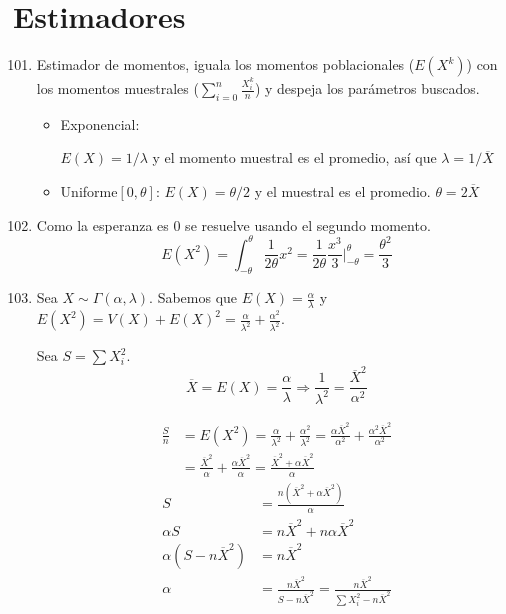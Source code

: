 \section{Estimadores}
\begin{enumerate}
	\setcounter{enumi}{100}
	\item
		Estimador de momentos, iguala los momentos poblacionales ($E(X^k)$) con los momentos muestrales ($\sum_{i=0}^n\frac{X_i^k}{n}$) y despeja los parámetros buscados.
		
		\begin{itemize}
			\item Exponencial:
			
				$E(X) = 1/\lambda$ y el momento muestral es el promedio, así que $\lambda =1/\overline{X}$
			\item Uniforme$[0,\theta]$:
				$E(X) = \theta/2$ y el muestral es el promedio. $\theta = 2\overline{X}$
		\end{itemize}
	
	\item
		Como la esperanza es $0$ se resuelve usando el segundo momento.
		$$E(X^2) = \int_{-\theta}^{\theta}\frac{1}{2\theta}x^2 = \frac{1}{2\theta} \frac{x^3}{3}\Big|_{-\theta}^{\theta} = \frac{\theta^2}{3}$$
		
	\item
		Sea $X\sim\Gamma(\alpha,\lambda)$.
		Sabemos que $E(X) = \frac{\alpha}{\lambda}$ y $E(X^2) = V(X) + E(X)^2 = \frac{\alpha}{\lambda^2} + \frac{\alpha^2}{\lambda^2}$.
		
		Sea $S = \sum X_i^2 $.
		$$\overline{X} = E(X) = \frac{\alpha}{\lambda} \Rightarrow \frac{1}{\lambda^2} = \frac{\overline{X}^2}{\alpha^2}$$
		
		
		\begin{align*}
			\frac{S}{n}	& = E(X^2) = \frac{\alpha}{\lambda^2} + \frac{\alpha^2}{\lambda^2} = \frac{\alpha \overline{X}^2}{\alpha^2} + \frac{\alpha^2 \overline{X}^2}{\alpha^2}	\\
						& = \frac{\overline{X}^2}{\alpha} + \frac{\alpha \overline{X}^2}{\alpha} = \frac{\overline{X}^2 + \alpha \overline{X}^2}{\alpha}
		\end{align*}
		\begin{align*}
			S								& = \frac{n(\overline{X}^2 + \alpha \overline{X}^2)}{\alpha}	\\
			\alpha S						& = n\overline{X}^2 + n\alpha \overline{X}^2					\\
			\alpha (S - n\overline{X}^2)	& = n\overline{X}^2												\\
			\alpha							& = \frac{n\overline{X}^2}{S - n\overline{X}^2} = \frac{n\overline{X}^2}{\sum X_i^2 - n\overline{X}^2}
		\end{align*}
		

\end{enumerate}
